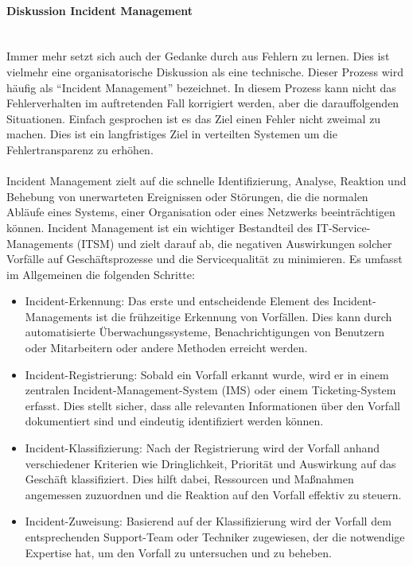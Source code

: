 \documentclass[../vs-script-first-v01.tex]{subfiles}
\begin{document}
\begin{itemize}
        \paragraph{Diskussion Incident Management}\mbox{}\\
        Immer mehr setzt sich auch der Gedanke durch aus Fehlern zu lernen. Dies ist vielmehr eine organisatorische Diskussion als eine technische. Dieser Prozess wird häufig als \enquote{Incident Management} bezeichnet. In diesem Prozess kann nicht das Fehlerverhalten im auftretenden Fall korrigiert werden, aber die darauffolgenden Situationen. Einfach gesprochen ist es das Ziel einen Fehler nicht zweimal zu machen. Dies ist ein langfristiges Ziel in verteilten Systemen um die Fehlertransparenz zu erhöhen.
        \\\\
        Incident Management zielt auf die schnelle Identifizierung, Analyse, Reaktion und Behebung von unerwarteten Ereignissen oder Störungen, die die normalen Abläufe eines Systems, einer Organisation oder eines Netzwerks beeinträchtigen können. Incident Management ist ein wichtiger Bestandteil des IT-Service-Managements (ITSM) und zielt darauf ab, die negativen Auswirkungen solcher Vorfälle auf Geschäftsprozesse und die Servicequalität zu minimieren. Es umfasst im Allgemeinen die folgenden Schritte:
        \begin{itemize}
          \item Incident-Erkennung: Das erste und entscheidende Element des Incident-Managements ist die frühzeitige Erkennung von Vorfällen. Dies kann durch automatisierte Überwachungssysteme, Benachrichtigungen von Benutzern oder Mitarbeitern oder andere Methoden erreicht werden.
          \item Incident-Registrierung: Sobald ein Vorfall erkannt wurde, wird er in einem zentralen Incident-Management-System (IMS) oder einem Ticketing-System erfasst. Dies stellt sicher, dass alle relevanten Informationen über den Vorfall dokumentiert sind und eindeutig identifiziert werden können.
          \item Incident-Klassifizierung: Nach der Registrierung wird der Vorfall anhand verschiedener Kriterien wie Dringlichkeit, Priorität und Auswirkung auf das Geschäft klassifiziert. Dies hilft dabei, Ressourcen und Maßnahmen angemessen zuzuordnen und die Reaktion auf den Vorfall effektiv zu steuern.
          \item Incident-Zuweisung: Basierend auf der Klassifizierung wird der Vorfall dem entsprechenden Support-Team oder Techniker zugewiesen, der die notwendige Expertise hat, um den Vorfall zu untersuchen und zu beheben.

\end{itemize}
\end{itemize}
\end{document}

